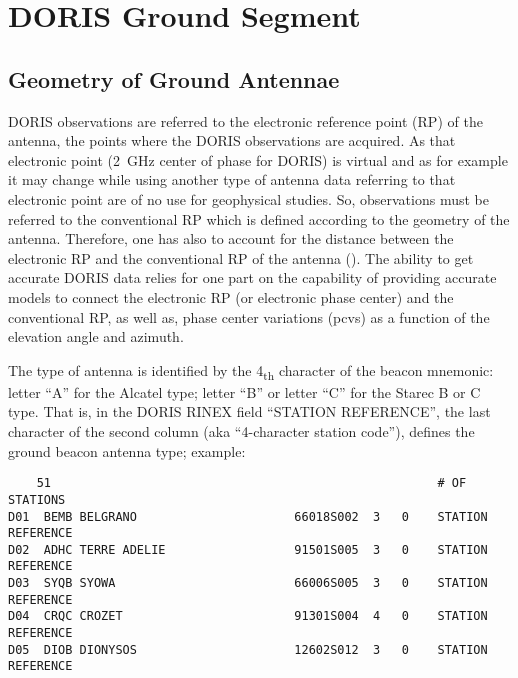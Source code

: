 \chapter{DORIS Ground Segment}
\label{ch:doris-ground-segment}


\section{Geometry of Ground Antennae}
DORIS observations are referred to the electronic reference point (RP) of the antenna, 
the points where the DORIS observations  are  acquired.  As  that  electronic  point 
(\SI{2}{\GHz} center of phase for DORIS) is virtual and as for example it may change 
while using another type of antenna data referring to that electronic point are of no 
use for geophysical studies. So, observations must be referred to the conventional RP 
which is defined according to the geometry of the antenna. Therefore, one has also to 
account for the distance between the electronic RP and the conventional RP of the antenna (\cite{TOURAIN2016}). 
The ability to get accurate DORIS data relies for one part on the capability of providing 
accurate models to connect the  electronic RP (or electronic phase center) and the conventional 
RP, as well as, phase center variations (\gls{pcv}s) as a function of the elevation angle and azimuth.

The type of antenna is identified by the 4\textsubscript{th} character of the beacon 
mnemonic: letter ``A'' for the Alcatel type; letter ``B'' or letter ``C'' for the 
Starec B or C type.  That is, in the DORIS RINEX field ``STATION REFERENCE'', the 
last character of the second column (aka ``4-character station code''), defines the 
ground beacon antenna type; example:
\begin{verbatim}
    51                                                      # OF STATIONS       
D01  BEMB BELGRANO                      66018S002  3   0    STATION REFERENCE   
D02  ADHC TERRE ADELIE                  91501S005  3   0    STATION REFERENCE   
D03  SYQB SYOWA                         66006S005  3   0    STATION REFERENCE   
D04  CRQC CROZET                        91301S004  4   0    STATION REFERENCE   
D05  DIOB DIONYSOS                      12602S012  3   0    STATION REFERENCE
\end{verbatim}

